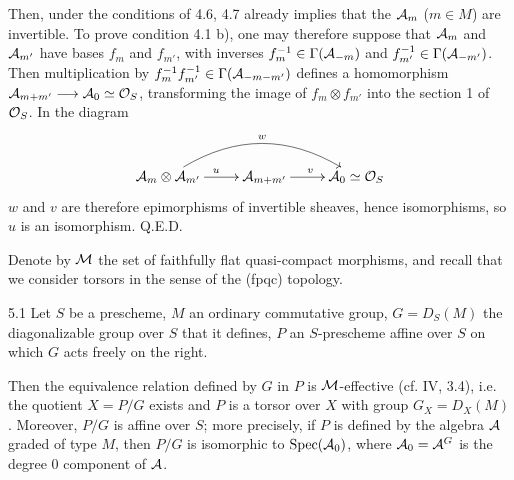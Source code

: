 Then, under the conditions of 4.6, 4.7 already implies that the $\cal A_m$ ($m\in M$) are invertible. To prove condition 4.1 b), one may therefore suppose that $\cal A_m$ and $\cal A_{m'}$ have bases $f_m$ and $f_{m'}$, with inverses $f_m^{-1}\in\Gamma(\cal A_{-m})$ and $f_{m'}^{-1}\in\Gamma(\cal A_{-m'})$. Then multiplication by $f_m^{-1}f_{m'}^{-1}\in\Gamma(\cal A_{-m-m'})$ defines a homomorphism $\cal A_{m+m'}\to\cal A_0\simeq\OS$, transforming the image of $f_m\otimes f_{m'}$ into the section 1 of $\OS$. In the diagram
\[
\xymatrix{\cal A_m\otimes\cal A_{m'}\ar[r]^u\ar@/^2pc/[rr]^w&\cal A_{m+m'}\ar[r]^v&\cal A_0\simeq\OS}
\]
$w$ and $v$ are therefore epimorphisms of invertible sheaves, hence isomorphisms, so $u$ is an isomorphism. \hfill Q.E.D.

 Denote by $\cal M$ the set of faithfully flat quasi-compact morphisms, and recall that we consider torsors in the sense of the (fpqc) topology.
\begin{theorem}{5.1}\label{VIII.5.1}
Let $S$ be a prescheme, $M$ an ordinary commutative group, $G=D_S(M)$ the diagonalizable group over $S$ that it defines, $P$ an $S$-prescheme affine over $S$ on which $G$ acts freely on the right.

Then the equivalence relation defined by $G$ in $P$ is $\cal M$-effective (cf. IV, 3.4), i.e. the quotient $X=P/G$ exists and $P$ is a torsor over $X$ with group $G_X=D_X(M)$. Moreover, $P/G$ is affine over $S$; more precisely, if $P$ is defined by the algebra $\cal A$ graded of type $M$, then $P/G$ is isomorphic to $\Spec(\cal A_0)$, where $\cal A_0=\cal A^G$ is the degree 0 component of $\cal A$.
\end{theorem}
